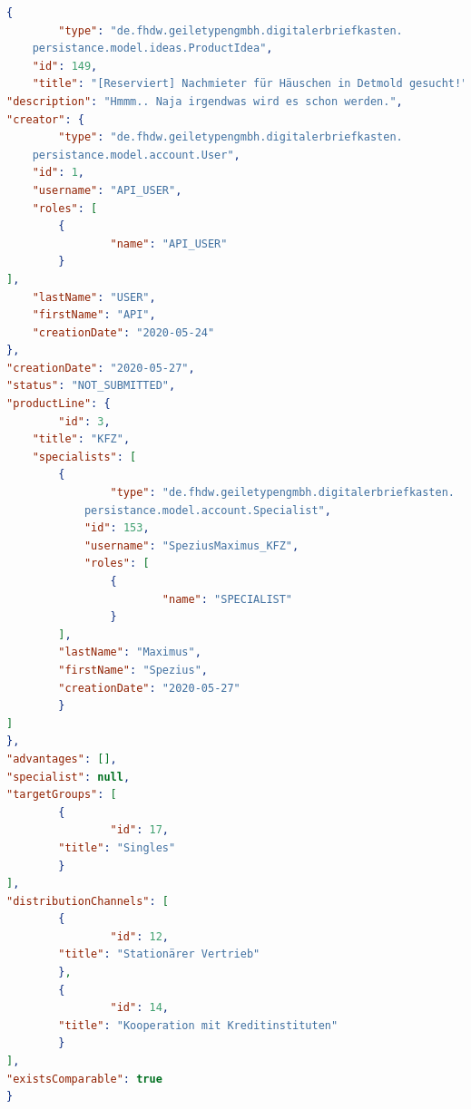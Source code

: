 \label{Anhang:Schnittstellen2}
\begin{lstlisting}[language=json, caption=Antwort /api/ideas/\{id\}, label=list:schnittstellen2]
{
        "type": "de.fhdw.geiletypengmbh.digitalerbriefkasten.
    persistance.model.ideas.ProductIdea",
    "id": 149,
    "title": "[Reserviert] Nachmieter für Häuschen in Detmold gesucht!",
"description": "Hmmm.. Naja irgendwas wird es schon werden.",
"creator": {
        "type": "de.fhdw.geiletypengmbh.digitalerbriefkasten.
    persistance.model.account.User",
    "id": 1,
    "username": "API_USER",
    "roles": [
        {
                "name": "API_USER"
        }
],
    "lastName": "USER",
    "firstName": "API",
    "creationDate": "2020-05-24"
},
"creationDate": "2020-05-27",
"status": "NOT_SUBMITTED",
"productLine": {
        "id": 3,
    "title": "KFZ",
    "specialists": [
        {
                "type": "de.fhdw.geiletypengmbh.digitalerbriefkasten.
            persistance.model.account.Specialist",
            "id": 153,
            "username": "SpeziusMaximus_KFZ",
            "roles": [
                {
                        "name": "SPECIALIST"
                }
        ],
        "lastName": "Maximus",
        "firstName": "Spezius",
        "creationDate": "2020-05-27"
        }
]
},
"advantages": [],
"specialist": null,
"targetGroups": [
        {
                "id": 17,
        "title": "Singles"
        }
],
"distributionChannels": [
        {
                "id": 12,
        "title": "Stationärer Vertrieb"
        },
        {
                "id": 14,
        "title": "Kooperation mit Kreditinstituten"
        }
],
"existsComparable": true
}
\end{lstlisting}
\label{Anhang:Klassendiagramme}

